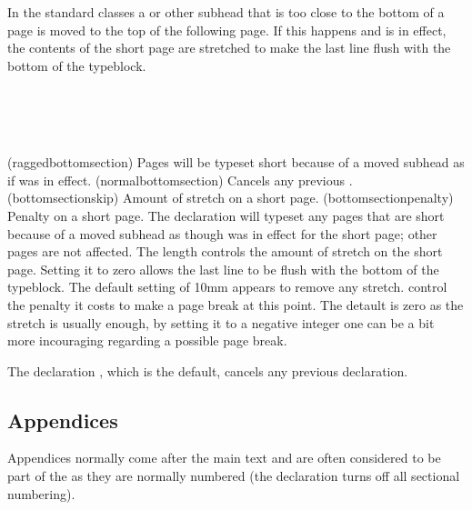     In the standard classes a \cmd{\section} or other
subhead
that is too close to the bottom of a page is moved to the top of the
following page. If this happens and \cmd{\flushbottom} is in effect, the
contents of the short page are stretched to make the last line flush with
the bottom of the typeblock.
\begin{syntax}
\cmd{\raggedbottomsection} \\
\cmd{\normalbottomsection} \\
\lnc{\bottomsectionskip} \\
\cmd{\bottomsectionpenalty}
\end{syntax}
\glossary(raggedbottomsection)%
  {}%
  {Pages will be typeset short because of a moved subhead as if
    was in effect.}
\glossary(normalbottomsection)%
  {}%
  {Cancels any previous .}
\glossary(bottomsectionskip)%
  {}%
  {Amount of stretch on a  short page.}
\glossary(bottomsectionpenalty)%
  {}%
  {Penalty on a  short page.}
The \cmd{\raggedbottomsection} declaration will typeset any pages that
are short because of a moved subhead as though \cmd{\raggedbottom}
was in effect for the short page; other pages are not affected. The
length \lnc{\bottomsectionskip} controls the amount of stretch on the short
page. Setting it to zero allows the last line to be flush with the bottom
of the typeblock. The default setting of 10mm appears to remove any
stretch. \cmd{\bottomsectionpenalty} control the penalty it costs to
make a page break at this point. The detault is zero as the stretch is
usually enough, by setting it to
a negative integer one can be a bit more incouraging regarding a
possible page break.

The declaration \cmd{\normalbottomsection}, which is the default,
cancels any previous \cmd{\raggedbottomsection} declaration.

\subsection{Appendices} \label{sec:appendices}

Appendices normally come after the main text and are
often considered to be part
of the \cmd{\mainmatter} as they are normally numbered (the \cmd{\backmatter}
declaration turns off all sectional numbering).


